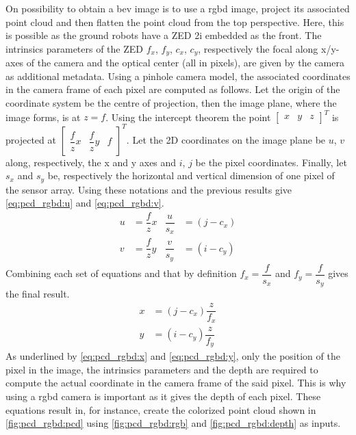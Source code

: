 On possibility to obtain a \gls{bev} image is to use a \gls{rgbd} image, project its associated point cloud and then
flatten the point cloud from the top perspective.
Here, this is possible as the ground robots have a ZED 2i embedded as the front.
The intrinsics parameters of the ZED $f_x$, $f_y$, $c_x$, $c_y$, respectively the focal along x/y-axes of the camera
and the optical center (all in pixels), are given by the camera as additional metadata.
Using a pinhole camera model, the associated coordinates in the camera frame of each pixel are computed as follows.
Let the origin of the coordinate system be the centre of projection, then the image plane, where the image forms, is at $z = f$.
Using the intercept theorem the point $\begin{bmatrix} %
                                           x & y & z
\end{bmatrix}^T$ is projected at $\begin{bmatrix}
                                      \dfrac{f}{z} x & \dfrac{f}{z} y & f
\end{bmatrix}^T$.
Let the 2D coordinates on the image plane be $u$, $v$ along, respectively, the x and y axes and $i$, $j$ be the pixel
coordinates.
Finally, let $s_x$ and $s_y$ be, respectively the horizontal and vertical dimension of one pixel of the sensor array.
Using these notations and the previous results give \cref{eq:pcd_rgbd:u} and \cref{eq:pcd_rgbd:v}.%
\begin{align}
    u &= \dfrac{f}{z} x & \dfrac{u}{s_x} &= (j - c_x) \label{eq:pcd_rgbd:u} \\
    v &= \dfrac{f}{z} y & \dfrac{v}{s_y} &= (i - c_y) \label{eq:pcd_rgbd:v}
\end{align}
Combining each set of equations and that by definition $f_x = \dfrac{f}{s_x}$ and $f_y = \dfrac{f}{s_y}$ gives the final result.%
\begin{align}
    x &= (j - c_x) \dfrac{z}{f_x} \label{eq:pcd_rgbd:x} \\
    y &= (i - c_y) \dfrac{z}{f_y} \label{eq:pcd_rgbd:y}
\end{align}
As underlined by \cref{eq:pcd_rgbd:x} and \cref{eq:pcd_rgbd:y}, only the position of the pixel in the image, the intrinsics
parameters and the depth are required to compute the actual coordinate in the camera frame of the said pixel.
This is why using a \gls{rgbd} camera is important as it gives the depth of each pixel.
These equations result in, for instance, create the colorized point cloud shown in \cref{fig:pcd_rgbd:pcd} using
\cref{fig:pcd_rgbd:rgb} and \cref{fig:pcd_rgbd:depth} as inputs.


